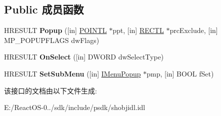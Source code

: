 \subsection*{Public 成员函数}
\begin{DoxyCompactItemize}
\item 
\mbox{\label{interface_i_menu_popup_acb6b74a603311187c9df5d1f383ba8d8}} 
H\+R\+E\+S\+U\+LT {\bfseries Popup} (\mbox{[}in\mbox{]} \hyperlink{struct___p_o_i_n_t_l}{P\+O\+I\+N\+TL} $\ast$ppt, \mbox{[}in\mbox{]} \hyperlink{struct___r_e_c_t_l}{R\+E\+C\+TL} $\ast$prc\+Exclude, \mbox{[}in\mbox{]} M\+P\+\_\+\+P\+O\+P\+U\+P\+F\+L\+A\+GS dw\+Flags)
\item 
\mbox{\label{interface_i_menu_popup_a24fd7a6ad6e505b364c59e080a2ce63b}} 
H\+R\+E\+S\+U\+LT {\bfseries On\+Select} (\mbox{[}in\mbox{]} D\+W\+O\+RD dw\+Select\+Type)
\item 
\mbox{\label{interface_i_menu_popup_ae88d5ac112f586367b7f4f9cf909895a}} 
H\+R\+E\+S\+U\+LT {\bfseries Set\+Sub\+Menu} (\mbox{[}in\mbox{]} \hyperlink{interface_i_menu_popup}{I\+Menu\+Popup} $\ast$pmp, \mbox{[}in\mbox{]} B\+O\+OL f\+Set)
\end{DoxyCompactItemize}


该接口的文档由以下文件生成\+:\begin{DoxyCompactItemize}
\item 
E\+:/\+React\+O\+S-\/0../sdk/include/psdk/shobjidl.\+idl\end{DoxyCompactItemize}
